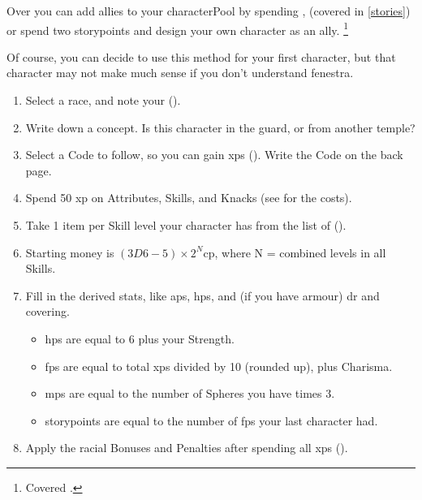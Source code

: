 \begin{multicols}{2}

\label{playerchosen}

\noindent
Over  you can add allies to your \gls{characterPool} by spending ,
(covered in \autoref{stories})
or spend two \glspl{storypoint} and design your own character as an ally.%
\footnote{Covered .}

Of course, you can decide to use this method for your first character, but that character may not make much sense if you don't understand \gls{fenestra}.

\begin{enumerate}
  \item\label{sumCCrace}
  Select a race, and note your  ().
  \item\label{sumCCconcept}
  Write down a concept.
  Is this character in the \gls{guard}, or from another temple?
  \item\label{sumCCcode}
  Select a Code to follow, so you can gain \glspl{xp} ().
  Write the Code on the back page.
  \item\label{sumCCxp}
  Spend 50 \gls{xp} on Attributes, Skills, and Knacks (see  for the costs).
  \item\label{sumCCequip}
  Take 1 item per Skill level your character has from the list of  ().
  \item\label{sumCCcoin}
  Starting money is $(3D6-5)\times 2^N$\gls{cp}, where N = combined levels in all Skills.
  \item\label{sumCCder}
  Fill in the derived stats, like \glspl{ap}, \glspl{hp}, and (if you have armour) \gls{dr} and \gls{covering}.
  \begin{itemize}
    \item
    \Glspl{hp} are equal to 6 plus your Strength.
    \item
    \Glspl{fp} are equal to total \glspl{xp} divided by 10 (rounded up), plus Charisma.
    \item
    \Glspl{mp} are equal to the number of Spheres you have times 3.
    \item
    \Glspl{storypoint} are equal to the number of \glspl{fp} your last character had.
  \end{itemize}
  \item\label{sumCCatt}
  Apply the racial Bonuses and Penalties after spending all \glspl{xp} ().
\end{enumerate}


\end{multicols}
